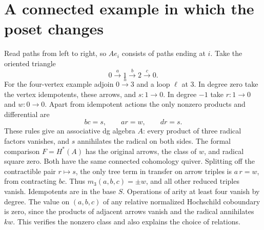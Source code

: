 \documentclass[11pt]{article}
\begin{document}
\section{A connected example in which the poset changes}
Read paths from left to right, so $Ae_i$ consists of paths ending at $i$.
Take the oriented triangle
\[
 0\xrightarrow{a}1\xrightarrow{b}2\xrightarrow{c}0 .
\]
For the four-vertex example adjoin $0\xrightarrow{h}3$ and a loop
$\ell$ at 3. In degree zero take the vertex idempotents, these arrows, and
$s\colon1\to0$. In degree $-1$ take $r\colon1\to0$ and $w\colon0\to0$.
Apart from idempotent actions the only nonzero products and differential are
\[
                   bc=s,\qquad ar=w,\qquad dr=s .
\]
These rules give an associative dg algebra $A$: every product of three
radical factors vanishes, and $s$ annihilates the radical on both sides.
The formal comparison $F=H^*(A)$ has the original arrows, the class of
$w$, and radical square zero. Both have the same connected cohomology
quiver. Splitting off the contractible pair $r\mapsto s$, the only
tree term in transfer on arrow triples is $a\,r=w$, from contracting
$bc$. Thus $m_3(a,b,c)=\pm w$, and all other reduced triples vanish.
Idempotents are in the base $S$. Operations of arity at least four vanish
by degree. The value on $(a,b,c)$ of any relative normalized Hochschild
coboundary is zero, since the products of adjacent arrows vanish and
the radical annihilates $kw$. This verifies the nonzero class and also
explains the choice of relations.
\end{document}
